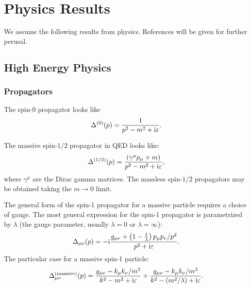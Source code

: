 \chapter{Physics Results}

\M We assume the following results from physics.
References will be given for further perusal.


\section{High Energy Physics}

\subsection{Propagators}

The spin-0 propagator looks like
\begin{equation}
\Delta^{(0)}(p) = \frac{1}{p^{2} - m^{2} + \mathrm{i}\varepsilon}.
\end{equation}


The massive spin-$1/2$ propagator in QED looks like:
\begin{equation}
\Delta^{(1/2)}(p) = \frac{(\gamma^{\mu}p_{\mu}+m)}{p^{2}-m^{2}+\mathrm{i}\varepsilon},
\end{equation}
where $\gamma^{\mu}$ are the Dirac gamma matrices. The massless
spin-$1/2$ propagators may be obtained taking the $m\to0$ limit.

The general form of the spin-1 propagator for a massive particle
requires a choice of gauge. The most general expression for the spin-1
propagator is parametrized by $\lambda$ (the gauge parameter, usually
$\lambda=0$ or $\lambda=\infty$):
\begin{equation}
\Delta_{\mu\nu}(p) = -\mathrm{i}\frac{g_{\mu\nu} + \left(1 - \frac{1}{\lambda}\right)p_{\mu}p_{\nu}/p^{2}}{p^{2}+\mathrm{i}\varepsilon}.
\end{equation}
The particular case for a massive spin-1 particle:
\begin{equation}
\Delta^{\text{(massive)}}_{\mu\nu}(p) = \frac{g_{\mu\nu} - k_{\mu}k_{\nu}/m^{2}}{k^{2}-m^{2}+\mathrm{i}\varepsilon}
+\frac{g_{\mu\nu} - k_{\mu}k_{\nu}/m^{2}}{k^{2}-(m^{2}/\lambda)+\mathrm{i}\varepsilon}.
\end{equation}

